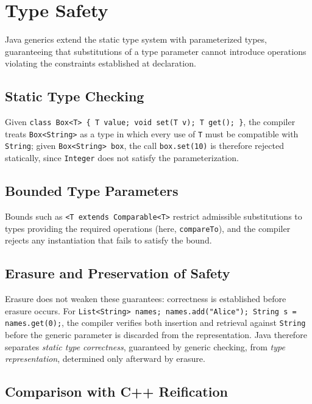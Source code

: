 \documentclass[11pt]{report}
\begin{document}

\section{Type Safety}
\label{JavaGenerics:TypeSafety}

Java generics extend the static type system with parameterized types,
guaranteeing that substitutions of a type parameter cannot introduce
operations violating the constraints established at declaration.

\subsection{Static Type Checking}

Given \texttt{class Box<T> \{ T value; void set(T v); T get(); \}}, the
compiler treats \texttt{Box<String>} as a type in which every use of
\texttt{T} must be compatible with \texttt{String}; given
\texttt{Box<String> box}, the call \texttt{box.set(10)} is therefore
rejected statically, since \texttt{Integer} does not satisfy the
parameterization.

\subsection{Bounded Type Parameters}

Bounds such as \texttt{<T extends Comparable<T>} restrict admissible
substitutions to types providing the required operations (here,
\texttt{compareTo}), and the compiler rejects any instantiation that fails
to satisfy the bound.

\subsection{Erasure and Preservation of Safety}

Erasure does not weaken these guarantees: correctness is established before
erasure occurs. For \texttt{List<String> names; names.add("Alice"); String
s = names.get(0);}, the compiler verifies both insertion and retrieval
against \texttt{String} before the generic parameter is discarded from the
representation. Java therefore separates \emph{static type correctness},
guaranteed by generic checking, from \emph{type representation}, determined
only afterward by erasure.

\subsection{Comparison with C++ Reification}
\label{JavaGenerics:TypeSafety:ComparisonCppReification}
\end{document}
